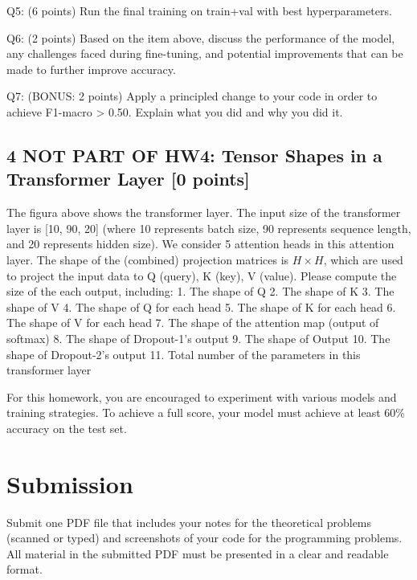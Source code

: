 \documentclass[
  letterpaper,
  DIV=11,
  numbers=noendperiod]{scrartcl}
\begin{document}
Q5: (6 points) Run the final training on train+val with best
hyperparameters.

Q6: (2 points) Based on the item above, discuss the performance of the
model, any challenges faced during fine-tuning, and potential
improvements that can be made to further improve accuracy.

Q7: (BONUS: 2 points) Apply a principled change to your code in order to
achieve F1-macro \textgreater{} 0.50. Explain what you did and why you
did it.

\subsection{4 NOT PART OF HW4: Tensor Shapes in a Transformer Layer {[}0
points{]}}\label{not-part-of-hw4-tensor-shapes-in-a-transformer-layer-0-points}

The figura above shows the transformer layer. The input size of the
transformer layer is {[}10, 90, 20{]} (where 10 represents batch size,
90 represents sequence length, and 20 represents hidden size). We
consider 5 attention heads in this attention layer. The shape of the
(combined) projection matrices is \(H\times H\), which are used to
project the input data to Q (query), K (key), V (value). Please compute
the size of the each output, including: 1. The shape of Q 2. The shape
of K 3. The shape of V 4. The shape of Q for each head 5. The shape of K
for each head 6. The shape of V for each head 7. The shape of the
attention map (output of softmax) 8. The shape of Dropout-1's output 9.
The shape of Output 10. The shape of Dropout-2's output 11. Total number
of the parameters in this transformer layer

For this homework, you are encouraged to experiment with various models
and training strategies. To achieve a full score, your model must
achieve at least 60\% accuracy on the test set.

\section{Submission}\label{submission}

Submit one PDF file that includes your notes for the theoretical
problems (scanned or typed) and screenshots of your code for the
programming problems. All material in the submitted PDF must be
presented in a clear and readable format.
\end{document}
